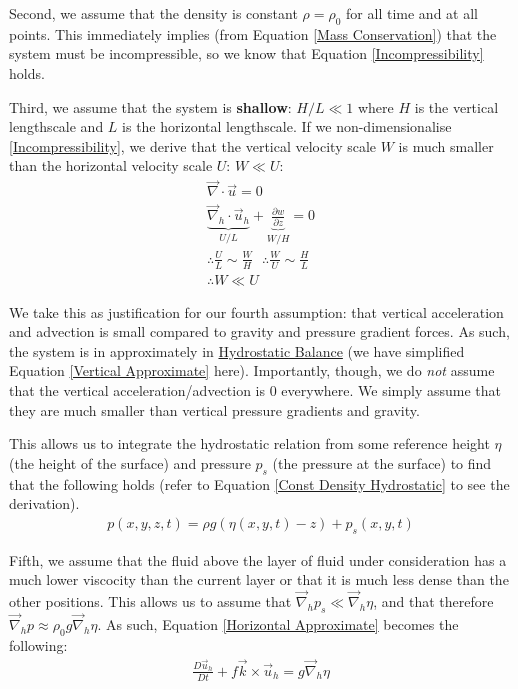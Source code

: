 Second, we assume that the density is constant $\rho=\rho_0$ for all time and at all points. This immediately implies (from Equation \ref{Mass Conservation}) that the system must be incompressible, so we know that Equation \ref{Incompressibility} holds.

Third, we assume that the system is \textbf{shallow}: $H/L\ll 1$ where $H$ is the vertical lengthscale and $L$ is the horizontal lengthscale. If we non-dimensionalise \ref{Incompressibility}, we derive that the vertical velocity scale $W$ is much smaller than the horizontal velocity scale $U$: $W\ll U$:
\begin{align*}
    \vec{\nabla}\cdot\vec{u}=0\\
    \underbrace{\vec{\nabla}_h\cdot\vec{u}_h}_{U/L}+\underbrace{\frac{\partial w}{\partial z}}_{W/H}=0\\
    \therefore \frac{U}{L}\sim\frac{W}{H}\text{   }\therefore
    \frac{W}{U}\sim\frac{H}{L}\\
    \therefore \boxed{W \ll U}
\end{align*}

We take this as justification for our fourth assumption: that vertical acceleration and advection is small compared to gravity and pressure gradient forces. As such, the system is in approximately in \hyperref[Hydrostatic GFD]{Hydrostatic Balance} (we have simplified Equation \ref{Vertical Approximate} here). Importantly, though, we do \textit{not} assume that the vertical acceleration/advection is $0$ everywhere. We simply assume that they are much smaller than vertical pressure gradients and gravity.

This allows us to integrate the hydrostatic relation from some reference height $\eta$ (the height of the surface) and pressure $p_s$ (the pressure at the surface) to find that the following holds (refer to Equation \ref{Const Density Hydrostatic} to see the derivation).
\begin{align*}
    p(x,y,z,t)=\rho g(\eta(x,y,t)-z)+p_s(x,y,t)
\end{align*}

Fifth, we assume that the fluid above the layer of fluid under consideration has a much lower viscocity than the current layer or that it is much less dense than the other positions. This allows us to assume that $\vec{\nabla}_hp_s\ll \vec{\nabla}_h\eta$, and that therefore $\vec{\nabla}_h p \approx \rho_0 g \vec{\nabla}_h \eta$. As such, Equation \ref{Horizontal Approximate} becomes the following:
\begin{align*}
    \frac{D\vec{u}_h}{Dt}+f\vec{k}\times\vec{u}_h=g\vec{\nabla}_h\eta
\end{align*}

